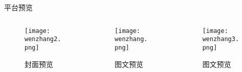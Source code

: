 \begin{frame}{平台预览}
    \begin{columns}
    \begin{column}{0.4\textwidth}
        \begin{figure}[h]
            \texttt{[image: wenzhang2.png]}
            \caption{封面预览}
        \end{figure}
    \end{column}
    \begin{column}{0.4\textwidth}
        \begin{figure}[h]
            \texttt{[image: wenzhang.png]}
            \caption{图文预览}
        \end{figure} 
    \end{column}
\begin{column}{0.4\textwidth}
           \begin{figure}[h]
       \texttt{[image: wenzhang3.png]}
       \caption{图文预览}
   \end{figure} 
\end{column}
\end{columns}
\end{frame}